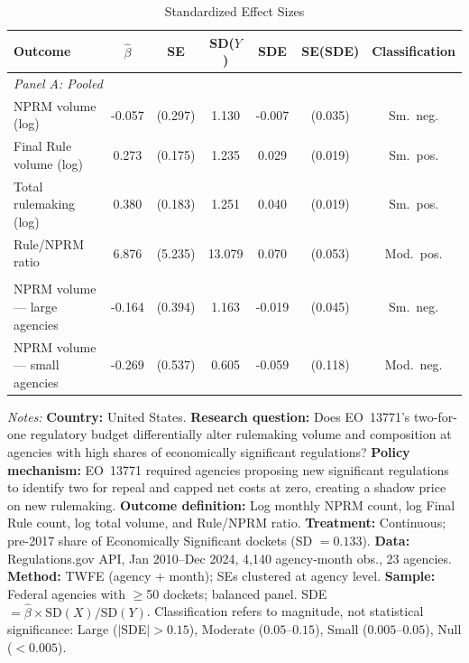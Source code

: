 \begin{table}[t]
\centering
\caption{Standardized Effect Sizes}
\label{tab:sde}
\begin{threeparttable}\small
\begin{tabular}{lcccccc}
\hline\hline
Outcome & $\hat{\beta}$ & SE & SD($Y$) & SDE & SE(SDE) & Classification \\
\hline
\multicolumn{7}{l}{\textit{Panel A: Pooled}} \\
NPRM volume (log) & -0.057 & (0.297) & 1.130 & -0.007 & (0.035) & Sm.\ neg. \\
Final Rule volume (log) & 0.273 & (0.175) & 1.235 & 0.029 & (0.019) & Sm.\ pos. \\
Total rulemaking (log) & 0.380 & (0.183) & 1.251 & 0.040 & (0.019) & Sm.\ pos. \\
Rule/NPRM ratio & 6.876 & (5.235) & 13.079 & 0.070 & (0.053) & Mod.\ pos. \\
\addlinespace
\multicolumn{7}{l}{\textit{Panel B: Heterogeneous (by agency size)}} \\
NPRM volume --- large agencies & -0.164 & (0.394) & 1.163 & -0.019 & (0.045) & Sm.\ neg. \\
NPRM volume --- small agencies & -0.269 & (0.537) & 0.605 & -0.059 & (0.118) & Mod.\ neg. \\
\hline\hline
\end{tabular}
\begin{tablenotes}[flushleft]\footnotesize
\item \textit{Notes:}
\textbf{Country:} United States.
\textbf{Research question:} Does EO~13771's two-for-one regulatory budget differentially alter rulemaking volume and composition at agencies with high shares of economically significant regulations?
\textbf{Policy mechanism:} EO~13771 required agencies proposing new significant regulations to identify two for repeal and capped net costs at zero, creating a shadow price on new rulemaking.
\textbf{Outcome definition:} Log monthly NPRM count, log Final Rule count, log total volume, and Rule/NPRM ratio.
\textbf{Treatment:} Continuous; pre-2017 share of Economically Significant dockets (SD $= 0.133$).
\textbf{Data:} Regulations.gov API, Jan 2010--Dec 2024, 4,140 agency-month obs., 23 agencies.
\textbf{Method:} TWFE (agency + month); SEs clustered at agency level.
\textbf{Sample:} Federal agencies with $\geq$50 dockets; balanced panel.
SDE $= \hat{\beta} \times \text{SD}(X) / \text{SD}(Y)$.
Classification refers to magnitude, not statistical significance: Large ($|$SDE$| > 0.15$), Moderate ($0.05$--$0.15$), Small ($0.005$--$0.05$), Null ($< 0.005$).
\end{tablenotes}
\end{threeparttable}
\end{table}
